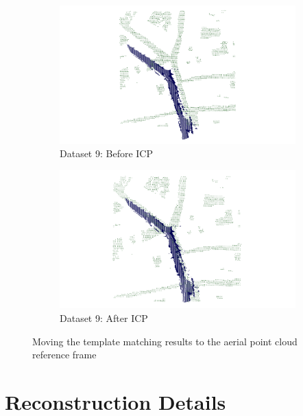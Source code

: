 \documentclass[11pt]{article}
\begin{document}
\begin{figure}[p]
        \begin{subfigure}{0.45\textwidth}
            \centering
            \includegraphics[width=\linewidth]{images/full/ply/5_6_1_before_icp}
            \caption{Dataset 9: Before ICP}
        \end{subfigure}
        \hfill
        \begin{subfigure}{0.45\textwidth}
            \centering
            \includegraphics[width=\linewidth]{images/full/ply/5_6_1_after_icp}
            \caption{Dataset 9: After ICP}
        \end{subfigure}

        \caption{Moving the template matching results to the aerial point cloud reference frame}
        \label{fig:icp_refine}
    \end{figure}
    \clearpage

    \section{Reconstruction Details}
\end{document}
